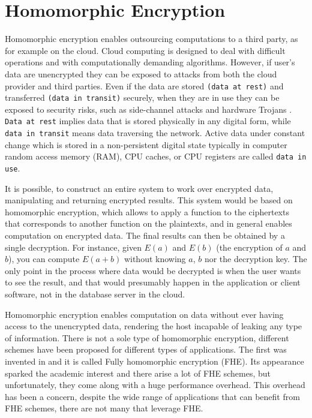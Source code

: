 \section{Homomorphic Encryption}\label{s:homomorphic-encryption}

Homomorphic encryption enables outsourcing computations to a third party, as for example on the cloud.
Cloud computing is designed to deal with difficult operations and with computationally demanding algorithms.
However, if user's data are unencrypted they can be exposed to attacks from both the cloud provider and third parties.
Even if the data are stored \texttt{(data at rest)} and transferred \texttt{(data in transit)} securely, when they are in use they can be exposed to security risks, such as side-channel attacks \cite{zhang2012cross} and hardware Trojans \cite{becker2013stealthy, tsoutsos2014advanced}.
\texttt{Data at rest} implies data that is stored physically in any digital form, while \texttt{data in transit} means data traversing the network.
Active data under constant change which is stored in a non-persistent digital state typically in computer random access memory (RAM), CPU caches, or CPU registers are called \texttt{data in use}.


It is possible, to construct an entire system to work over encrypted data, manipulating and returning encrypted results.
This system would be based on homomorphic encryption, which allows to apply a function to the ciphertexts that corresponds to another function on the plaintexts, and in general enables computation on encrypted data.
The final results can then be obtained by a single decryption.
For instance, given $E(a)$ and $E(b)$ (the encryption of $a$ and $b$), you can compute $E(a+b)$ without knowing $a$, $b$ nor the decryption key.
The only point in the process where data would be decrypted is when the user wants to see the result, and that would presumably happen in the application or client software, not in the database server in the cloud.


Homomorphic encryption enables computation on data without ever having access to the unencrypted data, rendering the host incapable of leaking any type of information.
There is not a sole type of homomorphic encryption, different schemes have been proposed for different types of applications.
The first was invented in \cite{gentry2009fully} and it is called Fully homomorphic encryption (FHE).
Its appearance sparked the academic interest and there arise a lot of FHE schemes, but unfortunately, they come along with a huge performance overhead.
This overhead has been a concern, despite the wide range of applications that can benefit from FHE schemes, there are not many that leverage FHE.


